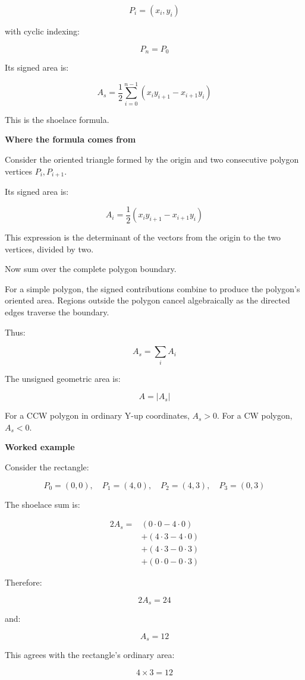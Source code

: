 \[
P_i=(x_i,y_i)
\]

with cyclic indexing:

\[
P_n=P_0
\]

Its signed area is:

\[
\boxed{ A_s= \frac12 \sum_{i=0}^{n-1} (x_iy_{i+1}-x_{i+1}y_i) }
\]

This is the shoelace formula.

\textbf{Where the formula comes from}

Consider the oriented triangle formed by the origin and two consecutive polygon vertices \(P_i,P_{i+1}\).

Its signed area is:

\[
A_i=\frac12(x_iy_{i+1}-x_{i+1}y_i)
\]

This expression is the determinant of the vectors from the origin to the two vertices, divided by two.

Now sum over the complete polygon boundary.

For a simple polygon, the signed contributions combine to produce the polygon's oriented area. Regions outside the polygon cancel algebraically as the directed edges traverse the boundary.

Thus:

\[
A_s=\sum_i A_i
\]

The unsigned geometric area is:

\[
\boxed{A=|A_s|}
\]

For a CCW polygon in ordinary Y-up coordinates, \(A_s>0\). For a CW polygon, \(A_s<0\).

\textbf{Worked example}

Consider the rectangle:

\[
P_0=(0,0),\quad P_1=(4,0),\quad P_2=(4,3),\quad P_3=(0,3)
\]

The shoelace sum is:

\[
\begin{aligned} 2A_s={}&(0\cdot0-4\cdot0)\\\ &+(4\cdot3-4\cdot0)\\\ &+(4\cdot3-0\cdot3)\\\ &+(0\cdot0-0\cdot3) \end{aligned}
\]

Therefore:

\[
2A_s=24
\]

and:

\[
\boxed{A_s=12}
\]

This agrees with the rectangle's ordinary area:

\[
4\times3=12
\]

